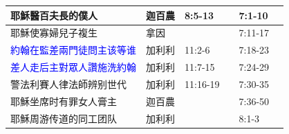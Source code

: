\begin{table}[H]
\begin{tabular}{p{13.07em}|p{8.43em}|p{5.285em}|p{5.57em}|p{5.285em}|p{4.855em}}
耶穌醫百夫長的僕人 & 迦百農   & 8:5-13 & \multicolumn{1}{r|}{} & 7:1-10 & \multicolumn{1}{r}{} \\\midrule

耶穌使寡婦兒子複生 & 拿因    & \multicolumn{1}{r|}{} & \multicolumn{1}{r|}{} & 7:11-17 & \multicolumn{1}{r}{} \\ \midrule

\textcolor{blue}{約翰在監差兩門徒問主该等谁} & 加利利   & 11:2-6& \multicolumn{1}{r|}{} & 7:18-23& \multicolumn{1}{r}{} \\ \midrule

\textcolor{blue}{差人走后主對眾人讚施洗約翰}& 加利利   & 11:7-15& \multicolumn{1}{r|}{} & 7:24-29& \multicolumn{1}{r}{} \\ \midrule

警法利賽人律法師辨别世代& 加利利   & 11:16-19& \multicolumn{1}{r|}{} & 7:30-35& \multicolumn{1}{r}{} \\ \midrule

耶穌坐席时有罪女人膏主 & 迦百農   & \multicolumn{1}{r|}{} & \multicolumn{1}{r|}{} & 7:36-50 & \multicolumn{1}{r}{} \\\midrule

耶穌周游传道的同工团队 & 加利利   & \multicolumn{1}{r|}{} & \multicolumn{1}{r|}{} & 8:1-3 & \multicolumn{1}{r}{} \\ \midrule

\end{tabular}%
\end{table}%

